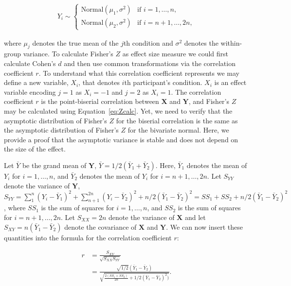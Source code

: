\documentclass[english,,man]{apa6}
\begin{document}
\begin{align}\label{eq:defY}
Y_{i} \sim \begin{cases} \mbox{Normal}(\mu_1, \sigma^2) & \mbox{if } i = 1, \ldots, n,\\
\mbox{Normal}(\mu_2, \sigma^2) & \mbox{if } i = n + 1, \ldots, 2n,\end{cases}
\end{align}

where \(\mu_j\) denotes the true mean of the \(j\)th condition and \(\sigma^2\) denotes the within-group variance. To calculate Fisher's \(Z\) as effect size measure we could first calculate Cohen's \(d\) and then use common transformations via the correlation coefficient \(r\). To understand what this correlation coefficient represents we may define a new variable, \(X_i\), that denotes \(i\)th participant's condition. \(X_i\) is an effect variable encoding \(j = 1\) as \(X_i = -1\) and \(j = 2\) as \(X_i = 1\). The correlation coefficient \(r\) is the point-biserial correlation between \(\mathbf{X}\) and \(\mathbf{Y}\), and Fisher's \(Z\) may be calculated using Equation~\eqref{eq:Zcalc}. Yet, we need to verify that the asymptotic distribution of Fisher's \(Z\) for the biserial correlation is the same as the asymptotic distribution of Fisher's \(Z\) for the bivariate normal. Here, we provide a proof that the asymptotic variance is stable and does not depend on the size of the effect.

Let \(\bar{Y}\) be the grand mean of \(\mathbf{Y}\), \(\bar{Y} = 1/2 (\bar{Y}_1 + \bar{Y}_2)\). Here, \(\bar{Y}_1\) denotes the mean of \(Y_i\) for \(i = 1, \ldots, n\), and \(\bar{Y}_2\) denotes the mean of \(Y_i\) for \(i = n + 1, \ldots, 2n\). Let \(S_{YY}\) denote the variance of \(\mathbf{Y}\), \(S_{YY} = \sum_1^n (Y_i - \bar{Y}_1)^2 + \sum_{n+1}^{2n} ( Y_i - \bar{Y}_2)^2 + n/2 (\bar{Y}_1 - \bar{Y}_2)^2 = SS_1 + SS_2 + n/2 (\bar{Y}_1 - \bar{Y}_2)^2\), where \(SS_1\) is the sum of squares for \(i = 1, \ldots, n\), and \(SS_2\) is the sum of squares for \(i = n + 1, \ldots, 2n\). Let \(S_{XX} = 2n\) denote the variance of \(\mathbf{X}\) and let \(S_{XY} = n(\bar{Y}_1 - \bar{Y}_2)\) denote the covariance of \(\mathbf{X}\) and \(\mathbf{Y}\). We can now insert these quantities into the formula for the correlation coefficient \(r\):

\begin{align*}
r &= \frac{S_{XY}}{\sqrt{S_{XX}S_{YY}}}\\
&= \frac{\sqrt{1/2}(\bar{Y}_1 - \bar{Y}_2)}{\sqrt{\frac{2(SS_1 + SS_2)}{2n} + 1/2(\bar{Y}_1 - \bar{Y}_2)^2)}}.
\end{align*}
\end{document}
